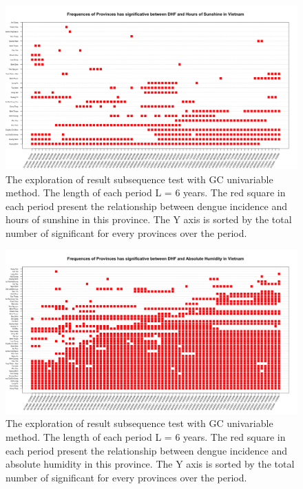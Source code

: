 \begin{figure}[h]
\begin{center}
\includegraphics[width = \linewidth]{../figures/annexe/result_sh.png}
\caption{The exploration of result subsequence test with GC univariable method. The length of each period L = 6 years. The red square in each period present the relationship between dengue incidence and hours of sunshine in this province. The Y axis is sorted by the total number of significant for every provinces over the period. }
\label{expl_6}	
\end{center}
\end{figure}

\begin{figure}[h]
\begin{center}
\includegraphics[width = \linewidth]{../figures/annexe/result_ah.png}
\caption{The exploration of result subsequence test with GC univariable method. The length of each period L = 6 years. The red square in each period present the relationship between dengue incidence and absolute humidity in this province. The Y axis is sorted by the total number of significant for every provinces over the period. }
\label{expl_7}	
\end{center}
\end{figure}

